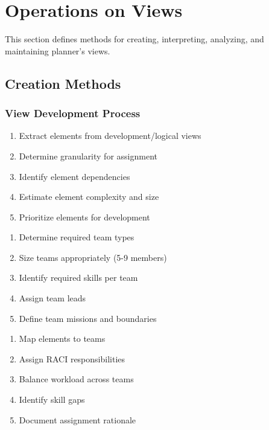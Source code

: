 \documentclass[11pt,letterpaper]{article}
\begin{document}
\section{Operations on Views}

This section defines methods for creating, interpreting, analyzing, and maintaining planner's views.

\subsection{Creation Methods}

\subsubsection{View Development Process}

\begin{guidancebox}
\begin{enumerate}[nosep]
    \item Extract elements from development/logical views
    \item Determine granularity for assignment
    \item Identify element dependencies
    \item Estimate element complexity and size
    \item Prioritize elements for development
\end{enumerate}
\end{guidancebox}

\begin{guidancebox}
\begin{enumerate}[nosep]
    \item Determine required team types
    \item Size teams appropriately (5-9 members)
    \item Identify required skills per team
    \item Assign team leads
    \item Define team missions and boundaries
\end{enumerate}
\end{guidancebox}

\begin{guidancebox}
\begin{enumerate}[nosep]
    \item Map elements to teams
    \item Assign RACI responsibilities
    \item Balance workload across teams
    \item Identify skill gaps
    \item Document assignment rationale
\end{enumerate}
\end{guidancebox}
\end{document}
